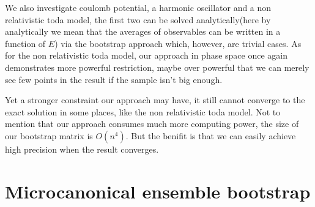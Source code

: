 \documentclass[aps, preprint,amsmath, amssymb]{revtex4-2}
\begin{document}
We also investigate coulomb potential, a harmonic oscillator and a non relativistic toda model, the first two can be solved analytically(here by analytically we mean that the averages of observables can be written in a function of $E$) via the bootstrap approach which, however, are trivial cases. As for the non relativistic toda model, our approach in phase space once again demonstrates more powerful restriction, maybe over powerful that we can merely see few points in the result if the sample isn't big enough.

Yet a stronger constraint our approach may have, it still cannot converge to the exact solution in some places, like the non relativistic toda model. Not to mention that our approach consumes much more computing power, the size of our bootstrap matrix is ${O}(n^4)$. But the benifit is that we can easily achieve high precision when the result converges.

\section{Microcanonical ensemble bootstrap}
\end{document}
